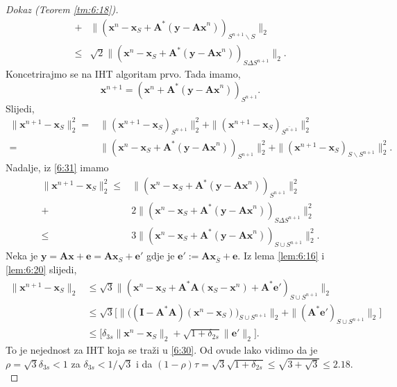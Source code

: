 \documentclass[a4paper,twoside,12pt]{memoir} %
\newcommand{\vect}[1]{\mathbf{#1}}
\renewcommand{\vec}{\vect}
\newcommand{\norm}[1]{\|{#1}\|}
\begin{document}
\begin{proof}[Dokaz (Teorem \ref{tm:6:18})]
\begin{align}
        + & \norm{(\vec x^n - \vec x_S + \vec A^*(\vec y - \vec{Ax}^n))_{S^{n+1} \backslash S}}_2 \nonumber \\
        \leq & \sqrt{2} \norm{(\vec x^n - \vec x_S + \vec A^*(\vec y - \vec{Ax}^n))_{S \Delta S^{n+1}}}_2.\label{6:31}
    \end{align}
    Koncetrirajmo se na IHT algoritam prvo. Tada imamo,
    \begin{equation*}
        \vec x^{n+1} = (\vec x^n + \vec A^*(\vec y - \vec{Ax}^n))_{S^{n+1}}.
    \end{equation*}
    Slijedi,
    \begin{align*}
        \norm{\vec x^{n+1} - \vec x_S}_2^2 = & \norm{(\vec x^{n+1} - \vec x_S)_{S^{n+1}}}_2^2 + \norm{(\vec x^{n+1} - \vec x_S)_{\overline{S^{n+1}}}}_2^2\\
        = & \norm{(\vec x^n - \vec x_S + \vec A^*(\vec y - \vec{Ax}^n))_{S^{n+1}}}_2^2 + \norm{(\vec x^{n+1} - \vec x_S)_{S \backslash S^{n+1}}}_2^2.
    \end{align*}
    Nadalje, iz \eqref{6:31} imamo
    \begin{align*}
        \norm{\vec x^{n+1} - \vec x_S}_2^2 \leq & \norm{(\vec x^n - \vec x_S + \vec A^*(\vec y - \vec{Ax}^n))_{S^{n+1}}}_2^2\\
        +&2\norm{(\vec x^n - \vec x_S + \vec A^*(\vec y - \vec{Ax}^n))_{S \Delta S^{n+1}}}_2^2 \\
        \leq & 3 \norm{(\vec x^n - \vec x_S + \vec A^* (\vec y - \vec{Ax}^n))_{S \cup S^{n+1}}}_2^2.
    \end{align*}
    Neka je $\vec y = \vec{Ax} + \vec e = \vec{Ax}_S + \vec e'$ gdje je $\vec e' := \vec {Ax}_{\bar S} + \vec e$. Iz lema \ref{lem:6:16} i \ref{lem:6:20} slijedi,
    \begin{align*}
        \norm{\vec x^{n+1} - \vec x_S}_2 & \leq \sqrt{3} \norm{(\vec x^n - \vec x_S + \vec A^* \vec A (\vec x_S - \vec x^n) + \vec A^* \vec e')_{S \cup S^{n+1}}}_2\\ 
        & \leq \sqrt{3}\big[ \norm{ \big( (\vec I - \vec A^*\vec A)(\vec x^n - \vec x_S) \big)_{S \cup S^{n+1}}}_2 + \norm{(\vec A^*\vec e')_{S \cup S^{n+1}}}_2 \big]\\
        & \leq \big[ \delta_{3s}\norm{\vec x^n - \vec x_S}_2 + \sqrt{1+\delta_{2s}}\norm{\vec e'}_2 \big].
    \end{align*}
    To je nejednost za IHT koja se tra\v{z}i u \eqref{6:30}. Od ovude lako vidimo da je $\rho = \sqrt{3}\delta_{3s} < 1$ za $\delta_{3s} < 1/\sqrt{3}$ i da $(1-\rho)\tau = \sqrt{3}\sqrt{1+\delta_{2s}} \leq \sqrt{3 + \sqrt{3}} \leq 2.18$.\\

\end{proof}
\end{document}
